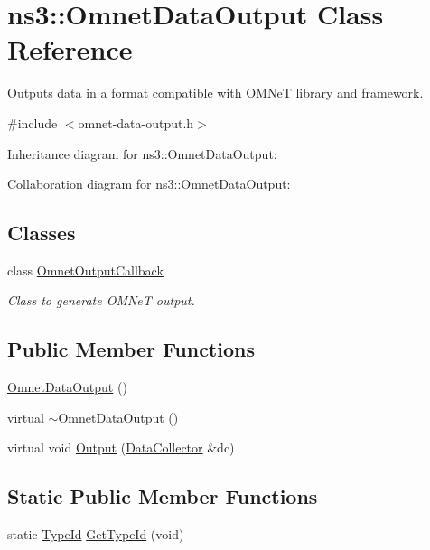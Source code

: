 \hypertarget{classns3_1_1OmnetDataOutput}{}\section{ns3\+:\+:Omnet\+Data\+Output Class Reference}
\label{classns3_1_1OmnetDataOutput}


Outputs data in a format compatible with O\+M\+NeT library and framework.  




{\ttfamily \#include $<$omnet-\/data-\/output.\+h$>$}



Inheritance diagram for ns3\+:\+:Omnet\+Data\+Output\+:


Collaboration diagram for ns3\+:\+:Omnet\+Data\+Output\+:
\subsection*{Classes}
\begin{DoxyCompactItemize}
\item 
class \hyperlink{classns3_1_1OmnetDataOutput_1_1OmnetOutputCallback}{Omnet\+Output\+Callback}
\begin{DoxyCompactList}\small\item\em Class to generate O\+M\+NeT output. \end{DoxyCompactList}\end{DoxyCompactItemize}
\subsection*{Public Member Functions}
\begin{DoxyCompactItemize}
\item 
\hyperlink{classns3_1_1OmnetDataOutput_aa4aaf532d094b1795baf29d527279e68}{Omnet\+Data\+Output} ()
\item 
virtual \hyperlink{classns3_1_1OmnetDataOutput_a707caaf1c97fd5e9aa6eaa31ebcb1acb}{$\sim$\+Omnet\+Data\+Output} ()
\item 
virtual void \hyperlink{classns3_1_1OmnetDataOutput_aaa7397204fe15cc52f86526acc8c034a}{Output} (\hyperlink{classns3_1_1DataCollector}{Data\+Collector} \&dc)
\end{DoxyCompactItemize}
\subsection*{Static Public Member Functions}
\begin{DoxyCompactItemize}
\item 
static \hyperlink{classns3_1_1TypeId}{Type\+Id} \hyperlink{classns3_1_1OmnetDataOutput_aeb7c096cebaa2da2a22214e0144ca7ca}{Get\+Type\+Id} (void)
\end{DoxyCompactItemize}
